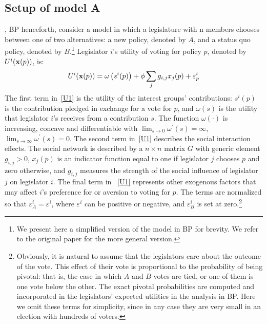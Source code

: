 \documentclass[nojss]{jss}
\begin{document}
\subsection{Setup of model A}\label{sec:modelA}

\cite{Battaglini+Patacchini:2018}, BP henceforth, consider a model in which a legislature with n members chooses between one of two alternatives: a new policy, denoted by $A$, and a status quo policy, denoted by $B$.\footnote{We present here a simplified version of the model in BP for brevity. We refer to the original paper for the more general version.} Legislator $i$'s utility of voting for policy $p$, denoted by $U^{i}({\bf x}(p))$, is:
\begin{equation}
	U^{i}({\bf x}(p))=\omega \left( s^{i}(p)\right) +\phi
	\sum_{j}g_{i,j}x_{j}(p)+\varepsilon _{p}^{i}  \label{U1}
\end{equation}%
The first term in~\ref{U1} is the utility of the interest groups' contributions: $s^{i}(p)$ is the contribution pledged in exchange for a vote
for $p$, and $\omega \left( s\right) $ is the utility that legislator $i$'s
receives from a contribution $s$. The function $\omega (\cdot )$ is
increasing, concave and differentiable with $\lim_{s\rightarrow 0}\omega
^{\prime }(s)=\infty $, $\lim_{s\rightarrow \infty }\omega ^{\prime }(s)=0$.
The second term in~\ref{U1} describes the social interaction effects. The
social network is described by a $n\times n$ matrix $G$ with generic element  $g_{i,j}>0$, $x_{j}(p)$ is an indicator function equal to one if legislator $j$ chooses $p$ and zero otherwise, and $g_{i,j}$ measures the strength of the social influence of legislator $j$ on legislator $i$. The final term in ~\ref{U1} represents other exogenous factors that may affect $i$'s preference for or aversion to voting for $p$. The terms are normalized so that $\varepsilon _{A}^{i}=\varepsilon ^{i}$, where $\varepsilon ^{i}$ can be positive or negative, and $\varepsilon _{B}^{i}$ is set at zero.\footnote{Obviously, it is natural to assume that the legislators care about the outcome of the vote. This effect of their vote is proportional to the probability of being pivotal: that is, the case in which $A$ and $B$ votes are tied, or one of them is one vote below the other. The exact pivotal probabilities are computed and incorporated in the legislators' expected utilities in the analysis in BP. Here we omit these terms for simplicity, since in any case they are very small in an election with hundreds of voters.}
\end{document}
